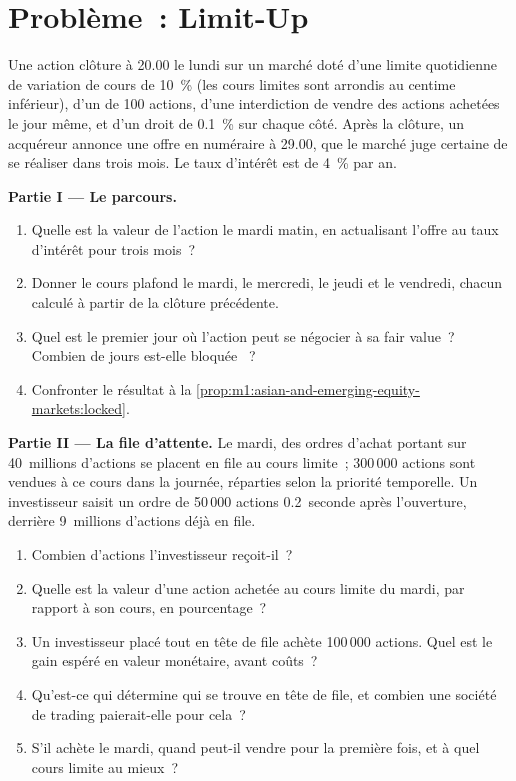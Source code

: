 \section{Problème~: Limit-Up}

\begin{problem}\label{pb:m1:asian-and-emerging-equity-markets:1}
Une action clôture à 20.00 le lundi sur un marché doté d'une limite quotidienne de
variation de cours de 10~\% (les cours limites sont arrondis au centime inférieur), d'un  de 100 actions, d'une interdiction
de vendre des actions achetées le jour même, et d'un droit de 0.1~\% sur chaque côté. Après
la clôture, un acquéreur annonce une offre en numéraire à 29.00, que le marché
juge certaine de se réaliser dans trois mois. Le taux d'intérêt est de 4~\% par
an.

\medskip\noindent\textbf{Partie I --- Le parcours.}
\begin{enumerate}
\item Quelle est la valeur de l'action le mardi matin, en actualisant l'offre au
taux d'intérêt pour trois mois~?
\item Donner le cours plafond le mardi, le mercredi, le jeudi et le vendredi,
chacun calculé à partir de la clôture précédente.
\item Quel est le premier jour où l'action peut se négocier à sa fair value~? Combien de jours
est-elle bloquée ~?
\item Confronter le résultat à la \cref{prop:m1:asian-and-emerging-equity-markets:locked}.
\end{enumerate}

\medskip\noindent\textbf{Partie II --- La file d'attente.}
Le mardi, des ordres d'achat portant sur 40~millions d'actions se placent en file au cours limite~; 300\,000
actions sont vendues à ce cours dans la journée, réparties selon la priorité temporelle. Un investisseur saisit
un ordre de 50\,000 actions 0.2~seconde après l'ouverture, derrière 9~millions d'actions
déjà en file.
\begin{enumerate}[resume]
\item Combien d'actions l'investisseur reçoit-il~?
\item Quelle est la valeur d'une action achetée au cours limite du mardi, par rapport à son
cours, en pourcentage~?
\item Un investisseur placé tout en tête de file achète 100\,000 actions. Quel est
le gain espéré en valeur monétaire, avant coûts~?
\item Qu'est-ce qui détermine qui se trouve en tête de file, et combien une société de trading
paierait-elle pour cela~?
\item S'il achète le mardi, quand peut-il vendre pour la première fois, et à quel cours limite
au mieux~?
\end{enumerate}


\end{problem}
